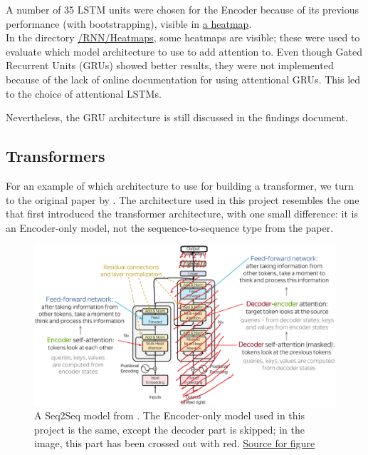 \documentclass{article}
\begin{document}
A number of 35 LSTM units were chosen for the Encoder because of its previous performance (with bootstrapping), visible in \href{https://github.com/AntonStantan/matura/blob/main/attentional-RNN/previousHeatmap.png}{a heatmap}.
\\[2em]
In the directory \href{https://github.com/AntonStantan/matura/tree/main/RNN/Heatmaps}{/RNN/Heatmaps}, some heatmaps are visible; these were used to evaluate which model architecture to use to add attention to. Even though Gated Recurrent Units (GRUs) showed better results, they were not implemented because of the lack of online documentation for using attentional GRUs. This led to the choice of attentional LSTMs.

Nevertheless, the GRU architecture is still discussed in the findings document.

\newpage
\subsection{Transformers}

For an example of which architecture to use for building a transformer, we turn to the original paper by \cite{vaswani2023attentionneed}. The architecture used in this project resembles the one that first introduced the transformer architecture, with one small difference: it is an Encoder-only model, not the sequence-to-sequence type from the paper.

\begin{figure}[htbp]
    \centering
    \includegraphics[width=0.5\paperwidth]{images/transformerSeq2Seq.png}
    \caption{A Seq2Seq model from \cite{vaswani2023attentionneed}. The 
    Encoder-only model used in this project is the same, except the decoder 
    part is skipped; in the image, this part has been crossed out with red. \href{https://www.cloud.studio/ai-llm-how-do-llms-work}{Source for figure}}
    \label{fig:transformerSeq2Seq}
\end{figure}
\end{document}
